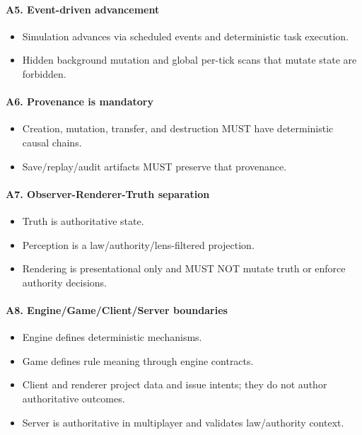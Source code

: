 \documentclass[9pt,a4paper,openany]{book}
\begin{document}
\paragraph{A5. Event-driven advancement}
\begin{itemize}
\item Simulation advances via scheduled events and deterministic task execution.\allowbreak{}
\item Hidden background mutation and global per-\allowbreak{}tick scans that mutate state are forbidden.\allowbreak{}
\end{itemize}

\paragraph{A6. Provenance is mandatory}
\begin{itemize}
\item Creation, mutation, transfer, and destruction MUST have deterministic causal chains.\allowbreak{}
\item Save/\allowbreak{}replay/\allowbreak{}audit artifacts MUST preserve that provenance.\allowbreak{}
\end{itemize}

\paragraph{A7. Observer-Renderer-Truth separation}
\begin{itemize}
\item Truth is authoritative state.\allowbreak{}
\item Perception is a law/\allowbreak{}authority/\allowbreak{}lens-\allowbreak{}filtered projection.\allowbreak{}
\item Rendering is presentational only and MUST NOT mutate truth or enforce authority decisions.\allowbreak{}
\end{itemize}

\paragraph{A8. Engine/Game/Client/Server boundaries}
\begin{itemize}
\item Engine defines deterministic mechanisms.\allowbreak{}
\item Game defines rule meaning through engine contracts.\allowbreak{}
\item Client and renderer project data and issue intents; they do not author authoritative outcomes.\allowbreak{}
\item Server is authoritative in multiplayer and validates law/\allowbreak{}authority context.\allowbreak{}
\end{itemize}
\end{document}
